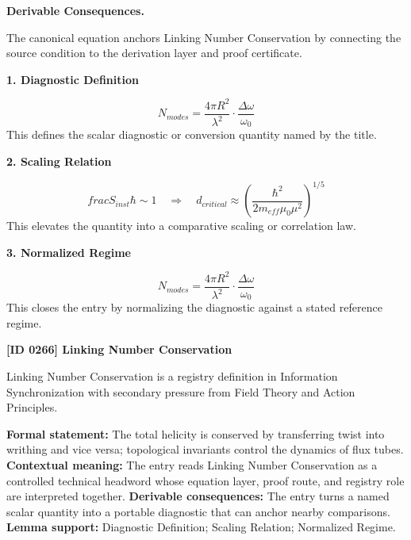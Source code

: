 \par\vspace{0.35em}
\noindent\textbf{Derivable Consequences.}\quad
\begingroup
\footnotesize
\raggedright
The canonical equation anchors Linking Number Conservation by connecting the source condition to the derivation layer and proof certificate.
\par\endgroup

\noindent\textbf{1. Diagnostic Definition}\par
\[
N_{modes} = \frac{4\pi R^2}{\lambda^2} \cdot \frac{\Delta\omega}{\omega_0}
\]
\noindent This defines the scalar diagnostic or conversion quantity named by the title.\par
\noindent\textbf{2. Scaling Relation}\par
\[
frac{S_{inst}}{\hbar} \sim 1 \quad \Rightarrow \quad d_{critical} \approx \left(\frac{\hbar^2}{2m_{eff}\mu_0\mu^2}\right)^{1/5}
\]
\noindent This elevates the quantity into a comparative scaling or correlation law.\par
\noindent\textbf{3. Normalized Regime}\par
\[
N_{modes} = \frac{4\pi R^2}{\lambda^2} \cdot \frac{\Delta\omega}{\omega_0}
\]
\noindent This closes the entry by normalizing the diagnostic against a stated reference regime.\par

\clearpage
\noindent\textbf{[ID 0266] Linking Number Conservation}\par
\vspace{0.35em}
\begingroup\small
{}
Linking Number Conservation is a registry definition in Information Synchronization with secondary pressure from Field Theory and Action Principles.

\begingroup\footnotesize\setlength{\emergencystretch}{3em}\sloppy
\textbf{Formal statement:} The total helicity is conserved by transferring twist into writhing and vice versa; topological invariants control the dynamics of flux tubes. \textbf{Contextual meaning:} The entry reads Linking Number Conservation as a controlled technical headword whose equation layer, proof route, and registry role are interpreted together. \textbf{Derivable consequences:} The entry turns a named scalar quantity into a portable diagnostic that can anchor nearby comparisons. \textbf{Lemma support:} Diagnostic Definition; Scaling Relation; Normalized Regime.\par
\endgroup

